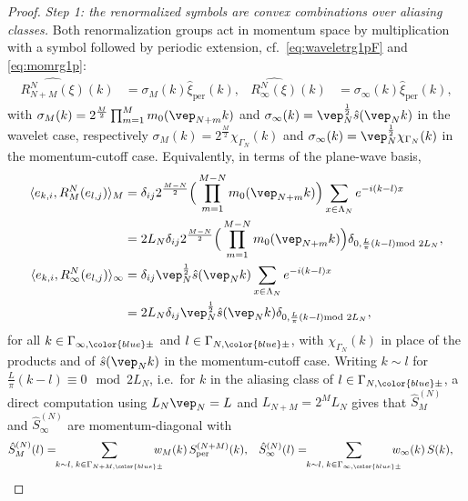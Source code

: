 \documentclass[a4paper, 11pt]{article}
\DeclareMathOperator{\1}{\mathds{1}}
\DeclareMathOperator{\per}{per}
\begin{document}
\begin{proof}
\emph{Step 1: the renormalized symbols are convex combinations over aliasing classes.} Both renormalization groups act in momentum space by multiplication with a symbol followed by periodic extension, cf.~\eqref{eq:waveletrg1pF} and \eqref{eq:momrg1p}:
\begin{align*}
\widehat{R^{N}_{N+M}(\xi)}(k) & = \sigma_{M}(k)\hat{\xi}_{\per}(k), & \widehat{R^{N}_{\infty}(\xi)}(k) & = \sigma_{\infty}(k)\hat{\xi}_{\per}(k),
\end{align*}
with $\sigma_{M}(k) = 2^{\frac{M}{2}}\prod_{m=1}^{M}m_{0}(\vep_{N+m}k)$ and $\sigma_{\infty}(k) = \vep_{N}^{\frac{1}{2}}\hat{s}(\vep_{N}k)$ in the wavelet case, respectively $\sigma_{M}(k) = 2^{\frac{M}{2}}\chi_{\Gamma_{N}}(k)$ and $\sigma_{\infty}(k) = \vep_{N}^{\frac{1}{2}}\chi_{\Gamma_{N}}(k)$ in the momentum-cutoff case. Equivalently, in terms of the plane-wave basis,
\begin{align}
\label{eq:waveletrginner}
\langle e_{k,i},R^{N}_{M}(e_{l,j})\rangle_{M} & = \delta_{ij}2^{\frac{M-N}{2}}\Big(\prod_{m=1}^{M-N}m_{0}(\vep_{N+m}k)\Big)\sum_{x\in\Lambda_{N}}e^{-i(k-l)x} \\ \nonumber
& = 2L_{N}\delta_{ij}2^{\frac{M-N}{2}}\Big(\prod_{m=1}^{M-N}m_{0}(\vep_{N+m}k)\Big)\delta_{0,\frac{L}{\pi}(k-l)\!\!\!\!\mod 2L_{N}}, \\ \nonumber
\langle e_{k,i},R^{N}_{\infty}(e_{l,j})\rangle_{\infty} & = \delta_{ij}\vep_{N}^{\frac{1}{2}}\hat{s}(\vep_{N}k)\sum_{x\in\Lambda_{N}}e^{-i(k-l)x} \\ \nonumber
& = 2L_{N}\delta_{ij}\vep_{N}^{\frac{1}{2}}\hat{s}(\vep_{N}k)\delta_{0,\frac{L}{\pi}(k-l)\!\!\!\!\mod 2L_{N}},
\end{align}
for all $k\in\Gamma_{\infty,{\color{blue}\pm}}$ and $l\in\Gamma_{N,{\color{blue}\pm}}$, with $\chi_{\Gamma_{N}}(k)$ in place of the products and of $\hat{s}(\vep_{N}k)$ in the momentum-cutoff case. Writing $k\sim l$ for $\tfrac{L}{\pi}(k-l)\equiv0\!\!\mod 2L_{N}$, i.e.~for $k$ in the aliasing class of $l\in\Gamma_{N,{\color{blue}\pm}}$, a direct computation using $L_{N}\vep_{N}=L$ and $L_{N+M}=2^{M}L_{N}$ gives that $\hat{S}^{(N)}_{M}$ and $\hat{S}^{(N)}_{\infty}$ are momentum-diagonal with
\begin{align}
\label{eq:convexsymb}
\hat{S}^{(N)}_{M}(l) & = \!\!\sum_{k\sim l,\!\ k\in\Gamma_{N+M,{\color{blue}\pm}}}\!\!\!\!\!\!w_{M}(k)\!\ S^{(N+M)}_{\per}(k), & \hat{S}^{(N)}_{\infty}(l) & = \!\!\sum_{k\sim l,\!\ k\in\Gamma_{\infty,{\color{blue}\pm}}}\!\!\!\!\!\!w_{\infty}(k)\!\ S(k),

\end{align}
\end{proof}
\end{document}
